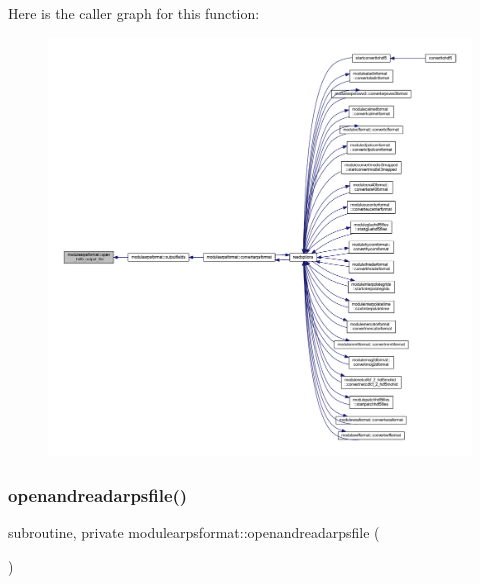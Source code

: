 Here is the caller graph for this function\+:\nopagebreak
\begin{figure}[H]
\begin{center}
\leavevmode
\includegraphics[width=350pt]{namespacemodulearpsformat_a9c9927c6fb171da5b0bfc4cd38595627_icgraph}
\end{center}
\end{figure}
\mbox{\label{namespacemodulearpsformat_a70ee83442772ea85df79da65ec4ea262}} 
\subsubsection{\texorpdfstring{openandreadarpsfile()}{openandreadarpsfile()}}
{\footnotesize\ttfamily subroutine, private modulearpsformat\+::openandreadarpsfile (\begin{DoxyParamCaption}{ }\end{DoxyParamCaption})\hspace{0.3cm}{\ttfamily [private]}}

